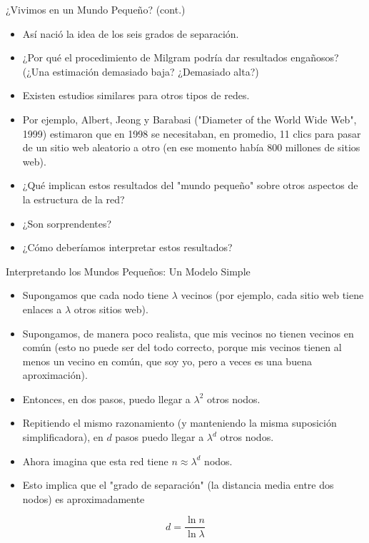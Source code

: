\documentclass[11pt]{beamer}
\begin{document}
\begin{frame}{¿Vivimos en un Mundo Pequeño? (cont.)}
\begin{itemize}
  \item Así nació la idea de los seis grados de separación.
  \item ¿Por qué el procedimiento de Milgram podría dar resultados engañosos? (¿Una estimación demasiado baja? ¿Demasiado alta?)
  \item Existen estudios similares para otros tipos de redes.
  \item Por ejemplo, Albert, Jeong y Barabasi ("Diameter of the World Wide Web", 1999) estimaron que en 1998 se necesitaban, en promedio, 11 clics para pasar de un sitio web aleatorio a otro (en ese momento había 800 millones de sitios web).
  \item ¿Qué implican estos resultados del "mundo pequeño" sobre otros aspectos de la estructura de la red?
  \item ¿Son sorprendentes?
  \item ¿Cómo deberíamos interpretar estos resultados?
\end{itemize}
\end{frame}
\begin{frame}{Interpretando los Mundos Pequeños: Un Modelo Simple}
\begin{itemize}
  \item Supongamos que cada nodo tiene $\lambda$ vecinos (por ejemplo, cada sitio web tiene enlaces a $\lambda$ otros sitios web).
  \item Supongamos, de manera poco realista, que mis vecinos no tienen vecinos en común (esto no puede ser del todo correcto, porque mis vecinos tienen al menos un vecino en común, que soy yo, pero a veces es una buena aproximación).
  \item Entonces, en dos pasos, puedo llegar a $\lambda^{2}$ otros nodos.
  \item Repitiendo el mismo razonamiento (y manteniendo la misma suposición simplificadora), en $d$ pasos puedo llegar a $\lambda^{d}$ otros nodos.
  \item Ahora imagina que esta red tiene $n \approx \lambda^{d}$ nodos.
  \item Esto implica que el "grado de separación" (la distancia media entre dos nodos) es aproximadamente
\end{itemize}

$$
d=\frac{\ln n}{\ln \lambda}
$$

\end{frame}
\end{document}
